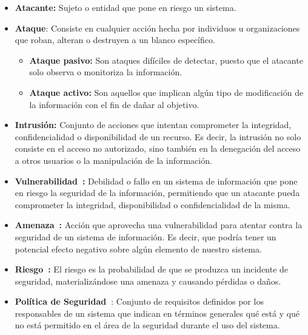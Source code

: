 \begin{itemize}
    \item \textbf{Atacante:} Sujeto o entidad que pone en riesgo un sistema.

    \item \textbf{Ataque}: Consiste en cualquier acción hecha por individuos u organizaciones  que roban, alteran o destruyen a un blanco específico.
          \begin{itemize}
              \item \textbf{Ataque pasivo:} Son ataques difíciles de detectar, puesto que el atacante solo observa o monitoriza la información.

              \item \textbf{Ataque activo:} Son aquellos que implican algún tipo de modificación de la información con el fin de dañar al objetivo.

          \end{itemize}

    \item \textbf{Intrusión:} Conjunto de acciones que intentan comprometer la integridad, confidencialidad o disponibilidad de un recurso. Es decir, la intrusión no solo consiste en el acceso no autorizado, sino también en la denegación del acceso a otros usuarios o la manipulación de la información.

    \item \textbf{Vulnerabilidad~\cite{incibe_2017}:} Debilidad o fallo en un sistema de información que pone en riesgo la seguridad de la información, permitiendo que un atacante pueda comprometer la integridad, disponibilidad o confidencialidad de la misma.


    \item \textbf{Amenaza~\cite{incibe_2017}:} Acción que aprovecha una vulnerabilidad para atentar contra la seguridad de un sistema de información. Es decir, que podría tener un potencial efecto negativo sobre algún elemento de nuestro sistema.

    \item \textbf{Riesgo~\cite{incibe_2017}:} El riesgo es la probabilidad de que se produzca un incidente de seguridad, materializándose una amenaza y causando pérdidas o daños.

    \item \textbf{Política de Seguridad~\cite{rediris_2002_security}}: Conjunto de requisitos definidos por los responsables de un sistema que indican en términos generales qué está y qué no está permitido en el área de la seguridad durante el uso del sistema.

\end{itemize}



